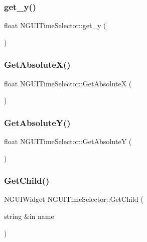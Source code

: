 \subsubsection{\texorpdfstring{get\+\_\+y()}{get\_y()}}
{\footnotesize\ttfamily float N\+G\+U\+I\+Time\+Selector\+::get\+\_\+y (\begin{DoxyParamCaption}{ }\end{DoxyParamCaption})}

\hypertarget{class_n_g_u_i_time_selector_a2fab6cf7e413d37990cd33b41ffb99d6}{}\label{class_n_g_u_i_time_selector_a2fab6cf7e413d37990cd33b41ffb99d6} 
\subsubsection{\texorpdfstring{Get\+Absolute\+X()}{GetAbsoluteX()}}
{\footnotesize\ttfamily float N\+G\+U\+I\+Time\+Selector\+::\+Get\+AbsoluteX (\begin{DoxyParamCaption}{ }\end{DoxyParamCaption})}

\hypertarget{class_n_g_u_i_time_selector_ad99bb3f95a0a805eb7cd6c2d04a680f9}{}\label{class_n_g_u_i_time_selector_ad99bb3f95a0a805eb7cd6c2d04a680f9} 
\subsubsection{\texorpdfstring{Get\+Absolute\+Y()}{GetAbsoluteY()}}
{\footnotesize\ttfamily float N\+G\+U\+I\+Time\+Selector\+::\+Get\+AbsoluteY (\begin{DoxyParamCaption}{ }\end{DoxyParamCaption})}

\hypertarget{class_n_g_u_i_time_selector_a9deba1a81968ee51c626040fccc3205a}{}\label{class_n_g_u_i_time_selector_a9deba1a81968ee51c626040fccc3205a} 
\subsubsection{\texorpdfstring{Get\+Child()}{GetChild()}\hspace{0.1cm}{\footnotesize\ttfamily [1/2]}}
{\footnotesize\ttfamily N\+G\+U\+I\+Widget N\+G\+U\+I\+Time\+Selector\+::\+Get\+Child (\begin{DoxyParamCaption}\item[{string \&in}]{name }\end{DoxyParamCaption})}

